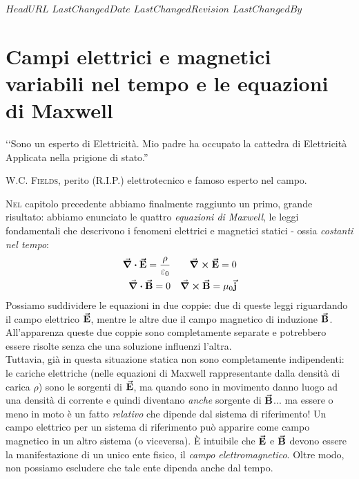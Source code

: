 \svnidlong
{$HeadURL$}
{$LastChangedDate$}
{$LastChangedRevision$}
{$LastChangedBy$}
\chapter{Campi elettrici e magnetici variabili nel tempo e le equazioni di Maxwell}

\begin{introduction}
	‘‘Sono un esperto di Elettricità. Mio padre ha occupato la cattedra di Elettricità Applicata nella	prigione di stato.''
	\begin{flushright}
		\textsc{W.C. Fields,} perito (R.I.P.) elettrotecnico e famoso esperto nel campo.
	\end{flushright}
\end{introduction}
\lettrine[findent=1pt, nindent=0pt]{N}{el} capitolo precedente abbiamo finalmente raggiunto un primo, grande risultato: abbiamo enunciato le quattro \textit{equazioni di Maxwell}, le leggi fondamentali che descrivono i fenomeni elettrici e magnetici statici - ossia \textit{costanti nel tempo}:
\begin{align*}
	\div{\vb*{\va{E}}}=\frac{\rho}{\varepsilon_0}&&\curl{\vb*{\va{E}}}=0\\
	\div{\vb*{\va{B}}}=0&&\curl{\vb*{\va{B}}}=\mu_0\vb*{\va{j}}
\end{align*}
Possiamo suddividere le equazioni in due coppie: due di queste leggi riguardando il campo elettrico $\vb*{\va{E}}$, mentre le altre due il campo magnetico di induzione $\vb*{\va{B}}$. All'apparenza queste due coppie sono completamente separate e potrebbero essere risolte senza che una soluzione influenzi l'altra.\\
Tuttavia, già in questa situazione statica non sono completamente indipendenti: le cariche elettriche (nelle equazioni di Maxwell rappresentante dalla densità di carica $\rho$) sono le sorgenti di $\vb*{\va{E}}$, ma quando sono in movimento danno luogo ad una densità di corrente e quindi diventano \textit{anche} sorgente di $\vb*{\va{B}}$... ma essere o meno in moto è un fatto \textit{relativo} che dipende dal sistema di riferimento! Un campo elettrico per un sistema di riferimento può apparire come campo magnetico in un altro sistema (o viceversa). È intuibile che $\vb*{\va{E}}$ e $\vb*{\va{B}}$ devono essere la manifestazione di un unico ente fisico, il \textit{campo elettromagnetico}. Oltre modo, non possiamo escludere che tale ente dipenda anche dal tempo.\\

